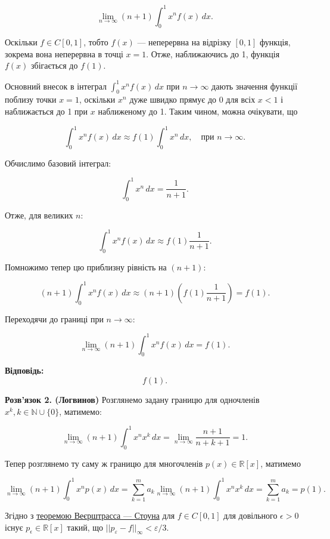 \documentclass{article}
\begin{document}
\[
\lim_{n \to \infty} (n + 1) \int_0^1 x^n f(x)\,dx.
\]

Оскільки \( f \in C[0, 1] \), тобто \( f(x) \) — неперервна на відрізку \([0,1]\) функція, зокрема вона неперервна в точці \( x = 1 \). Отже, наближаючись до 1, функція \( f(x) \) збігається до \( f(1) \).

Основний внесок в інтеграл \(\int_0^1 x^n f(x) \, dx\) при \( n \to \infty \) дають значення функції поблизу точки \( x = 1 \), оскільки \( x^n \) дуже швидко прямує до 0 для всіх \( x < 1 \) і наближається до 1 при \( x \) наближеному до 1. Таким чином, можна очікувати, що

\[
\int_0^1 x^n f(x)\,dx \approx f(1) \int_0^1 x^n \, dx, \quad \text{при } n \to \infty.
\]

Обчислимо базовий інтеграл:

\[
\int_0^1 x^n \, dx = \frac{1}{n+1}.
\]

Отже, для великих \( n \):

\[
\int_0^1 x^n f(x)\,dx \approx f(1)\frac{1}{n+1}.
\]

Помножимо тепер цю приблизну рівність на \( (n+1) \):

\[
(n+1) \int_0^1 x^n f(x)\,dx \approx (n+1) \left( f(1)\frac{1}{n+1} \right) = f(1).
\]

Переходячи до границі при \( n \to \infty \):

\[
\lim_{n \to \infty} (n + 1) \int_0^1 x^n f(x)\,dx = f(1).
\]

\textbf{Відповідь:}  
\[
\boxed{f(1)}.
\]


\textbf{Розв’язок 2. (Логвинов)} Розглянемо задану границю для одночленів $x^k, k \in \mathbb{N} \cup \{0\}$, матимемо:

\[
\lim_{n \to \infty} (n + 1) \int_{0}^{1} x^n x^k \, dx = \lim_{n \to \infty} \frac{n + 1}{n+k+1} = 1.
\]

Тепер розглянемо ту саму ж границю для многочленів $p(x) \in \mathbb{R}[x]$, матимемо

\[
\lim_{n \to \infty} (n + 1)  \int_{0}^{1} x^n p(x) \, dx = \sum_{k=1}^m a_k \lim_{n \to \infty}  (n + 1)   \int_{0}^{1} x^n x^k\, dx = \sum_{k=1}^m a_k = p(1).
\]

Згідно з  \href{https://uk.wikipedia.org/wiki/%D0%A2%D0%B5%D0%BE%D1%80%D0%B5%D0%BC%D0%B0_%D0%92%D0%B5%D1%94%D1%80%D1%88%D1%82%D1%80%D0%B0%D1%81%D1%81%D0%B0_%E2%80%94_%D0%A1%D1%82%D0%BE%D1%83%D0%BD%D0%B0#%D0%A2%D0%B5%D0%BE%D1%80%D0%B5%D0%BC%D0%B0_%D0%92%D0%B5%D1%94%D1%80%D1%88%D1%82%D1%80%D0%B0%D1%81%D1%81%D0%B0}{теоремою Веєрштрасса — Стоуна} для $f \in C[0, 1]$ для довільного $\epsilon>0$ існує $p_\epsilon \in \mathbb{R}[x]$ такий, що $||p_\varepsilon-f||_\infty < \varepsilon/3$.
\end{document}
